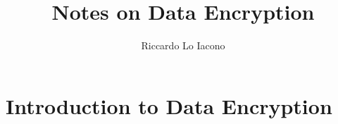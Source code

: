 \documentclass[moon, draft]{lectures2}
\title{Notes on Data Encryption}
\author{Riccardo Lo Iacono}
\begin{document}
    \maketitle

    \section{Introduction to Data Encryption}
    
\end{document}
